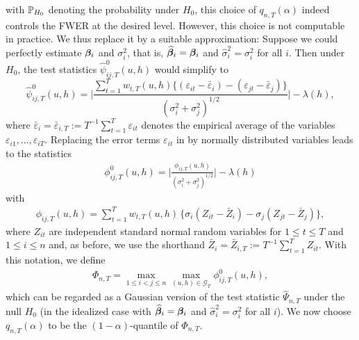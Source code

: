 \documentclass[12pt]{article}
\makeatletter
\renewcommand{\eqref}[1]{\tagform@{\ref{#1}}}
\makeatother
\begin{document}
with $\mathbb{P}_{H_0}$ denoting the probability under $H_0$, this choice of $q_{n,T}(\alpha)$ indeed controls the FWER at the desired level. However, this choice is not computable in practice. We thus replace it by a suitable approximation: Suppose we could perfectly estimate $\bm{\beta}_i$ and $\sigma_i^2$, that is, $\widehat{\bm{\beta}}_i = \bm{\beta}_i$ and $\widehat{\sigma}_i^2 = \sigma_i^2$ for all $i$. Then under $H_0$, the test statistics $\widehat{\psi}^0_{ij, T}(u, h)$ would simplify to 
\begin{equation}\label{eq:stat-idealized}
\widehat{\psi}^0_{ij, T}(u, h) = \Big| \frac{\sum\nolimits_{t=1}^T w_{t,T}(u, h) \{ (\varepsilon_{it} - \bar{\varepsilon}_i) - (\varepsilon_{jt} - \bar{\varepsilon}_j) \}}{(\sigma_i^2 + \sigma_j^2)^{1/2}} \Big| - \lambda(h), 
\end{equation}
where $\bar{\varepsilon}_i = \bar{\varepsilon}_{i,T} := T^{-1} \sum_{t=1}^T \varepsilon_{it}$ denotes the empirical average of the variables $\varepsilon_{i1},\ldots,\varepsilon_{iT}$. Replacing the error terms $\varepsilon_{it}$ in \eqref{eq:stat-idealized} by normally distributed variables leads to the statistics
\begin{align}\label{eq:phi_zero_ij}
\phi^0_{ij, T}(u, h) =  \bigg|\frac{\phi_{ij, T}(u, h)}{(\sigma_i^2 + \sigma_j^2)^{1/2}}\bigg| - \lambda(h)
\end{align}
with 
\begin{align}\label{eq:phi_ij}
\phi_{ij, T}(u, h) = \sum\limits_{t=1}^T w_{t,T}(u, h) \, \big\{ \sigma_i (Z_{it} - \bar{Z}_i) - \sigma_j (Z_{jt} - \bar{Z}_j) \big\},
\end{align}
where $Z_{it}$ are independent standard normal random variables for $1 \le t \le T$ and $1 \le i \le n$
and, as before, we use the shorthand $\bar{Z}_i = \bar{Z}_{i,T} := T^{-1} \sum_{t=1}^T Z_{it}$. With this notation, we define 
\begin{align}\label{eq:Phi}
\Phi_{n,T} = \max_{1 \le i < j \le n}\max_{(u, h) \in \mathcal{G}_T} \phi^0_{ij, T}(u, h),
\end{align}
which can be regarded as a Gaussian version of the test statistic $\widehat{\Psi}_{n,T}$ under the null $H_0$ (in the idealized case with $\widehat{\bm{\beta}}_i = \bm{\beta}_i$ and $\widehat{\sigma}_i^2 = \sigma_i^2$ for all $i$). We now choose $q_{n,T}(\alpha)$ to be the $(1-\alpha)$-quantile of $\Phi_{n,T}$. 
\end{document}
